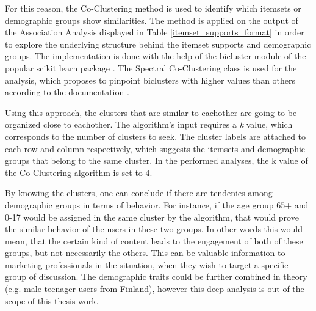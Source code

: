     For this reason, the Co-Clustering method is used to identify which itemsets or demographic groups show similarities. The method is applied on the output of the Association Analysis displayed in Table \ref{itemset_supports_format} in order to explore the underlying structure behind the itemset supports and demographic groups. The implementation is done with the help of the bicluster module \cite{scikit-bicluster} of the popular scikit learn package \cite{scikit-learn}. The Spectral Co-Clustering class is used for the analysis, which proposes to pinpoint biclusters with higher values than others according to the documentation \cite{scikit-bicluster}. 

    Using this approach, the clusters that are similar to eachother are going to be organized close to eachother. The algorithm's input requires a \textit{k} value, which corresponds to the number of clusters to seek. The cluster labels are attached to each row and column respectively, which suggests the itemsets and demographic groups that belong to the same cluster. In the performed analyses, the k value of the Co-Clustering algorithm is set to $4$. 

    By knowing the clusters, one can conclude if there are tendenies among demographic groups in terms of behavior. For instance, if the age group 65+ and 0-17 would be assigned in the same cluster by the algorithm, that would prove the similar behavior of the users in these two groups. In other words this would mean, that the certain kind of content leads to the engagement of both of these groups, but not necessarily the others. This can be valuable information to marketing professionals in the situation, when they wish to target a specific group of discussion. The demographic traits could be further combined in theory (e.g. male teenager users from Finland), however this deep analysis is out of the scope of this thesis work. 